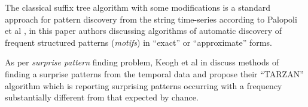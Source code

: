 The classical suffix tree algorithm \cite{citeulike:707616} with some modifications is a standard approach for pattern discovery from the string time-series according to Palopoli et al \cite{citeulike:5003338}, in this paper authors discussing algorithms of automatic discovery of frequent structured patterns (\textit{motifs}) in ``exact'' or ``approximate'' forms. 

As per \textit{surprise pattern} finding problem, Keogh et al in \cite{citeulike:3025877} discuss methods of finding a surprise patterns from the temporal data and propose their ``TARZAN'' algorithm which is reporting surprising patterns occurring with a frequency substantially different from that expected by chance.